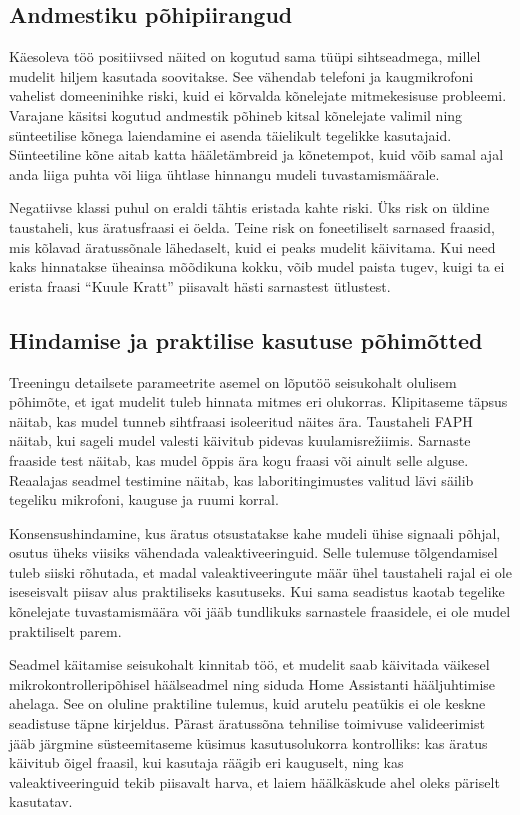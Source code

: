 \subsection{Andmestiku põhipiirangud}
Käesoleva töö positiivsed näited on kogutud sama tüüpi sihtseadmega, millel mudelit hiljem kasutada soovitakse. See vähendab telefoni ja kaugmikrofoni vahelist domeeninihke riski, kuid ei kõrvalda kõnelejate mitmekesisuse probleemi. Varajane käsitsi kogutud andmestik põhineb kitsal kõnelejate valimil ning sünteetilise kõnega laiendamine ei asenda täielikult tegelikke kasutajaid. Sünteetiline kõne aitab katta hääletämbreid ja kõnetempot, kuid võib samal ajal anda liiga puhta või liiga ühtlase hinnangu mudeli tuvastamismäärale.

Negatiivse klassi puhul on eraldi tähtis eristada kahte riski. Üks risk on üldine taustaheli, kus äratusfraasi ei öelda. Teine risk on foneetiliselt sarnased fraasid, mis kõlavad äratussõnale lähedaselt, kuid ei peaks mudelit käivitama. Kui need kaks hinnatakse üheainsa mõõdikuna kokku, võib mudel paista tugev, kuigi ta ei erista fraasi \enquote{Kuule Kratt} piisavalt hästi sarnastest ütlustest.

\subsection{Hindamise ja praktilise kasutuse põhimõtted}
Treeningu detailsete parameetrite asemel on lõputöö seisukohalt olulisem põhimõte, et igat mudelit tuleb hinnata mitmes eri olukorras. Klipitaseme täpsus näitab, kas mudel tunneb sihtfraasi isoleeritud näites ära. Taustaheli FAPH näitab, kui sageli mudel valesti käivitub pidevas kuulamisrežiimis. Sarnaste fraaside test näitab, kas mudel õppis ära kogu fraasi või ainult selle alguse. Reaalajas seadmel testimine näitab, kas laboritingimustes valitud lävi säilib tegeliku mikrofoni, kauguse ja ruumi korral.

Konsensushindamine, kus äratus otsustatakse kahe mudeli ühise signaali põhjal, osutus üheks viisiks vähendada valeaktiveeringuid. Selle tulemuse tõlgendamisel tuleb siiski rõhutada, et madal valeaktiveeringute määr ühel taustaheli rajal ei ole iseseisvalt piisav alus praktiliseks kasutuseks. Kui sama seadistus kaotab tegelike kõnelejate tuvastamismäära või jääb tundlikuks sarnastele fraasidele, ei ole mudel praktiliselt parem.

Seadmel käitamise seisukohalt kinnitab töö, et mudelit saab käivitada väikesel mikrokontrolleripõhisel häälseadmel ning siduda Home Assistanti hääljuhtimise ahelaga. See on oluline praktiline tulemus, kuid arutelu peatükis ei ole keskne seadistuse täpne kirjeldus. Pärast äratussõna tehnilise toimivuse valideerimist jääb järgmine süsteemitaseme küsimus kasutusolukorra kontrolliks: kas äratus käivitub õigel fraasil, kui kasutaja räägib eri kauguselt, ning kas valeaktiveeringuid tekib piisavalt harva, et laiem häälkäskude ahel oleks päriselt kasutatav.


